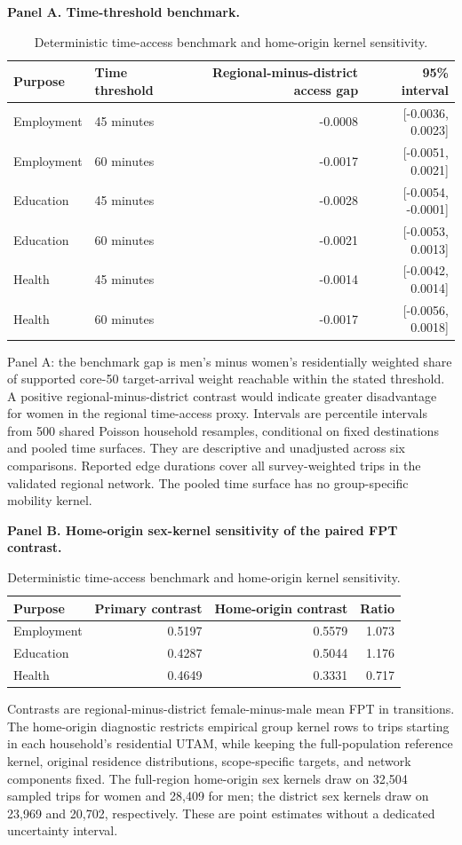 \begin{table}[ht]
\centering
\caption{Deterministic time-access benchmark and home-origin kernel sensitivity.}
\label{tab:s12_time_home}
\noindent\textbf{Panel A. Time-threshold benchmark.}\\[3pt]
\begin{tabular}{llrr}
\toprule
Purpose & Time threshold & Regional-minus-district access gap & 95\% interval \\
\midrule
Employment & 45 minutes & -0.0008 & [-0.0036, 0.0023] \\
Employment & 60 minutes & -0.0017 & [-0.0051, 0.0021] \\
Education & 45 minutes & -0.0028 & [-0.0054, -0.0001] \\
Education & 60 minutes & -0.0021 & [-0.0053, 0.0013] \\
Health & 45 minutes & -0.0014 & [-0.0042, 0.0014] \\
Health & 60 minutes & -0.0017 & [-0.0056, 0.0018] \\
\bottomrule
\end{tabular}

\smallskip
\footnotesize Panel A: the benchmark gap is men's minus women's residentially weighted share of supported core-50 target-arrival weight reachable within the stated threshold. A positive regional-minus-district contrast would indicate greater disadvantage for women in the regional time-access proxy. Intervals are percentile intervals from 500 shared Poisson household resamples, conditional on fixed destinations and pooled time surfaces. They are descriptive and unadjusted across six comparisons. Reported edge durations cover all survey-weighted trips in the validated regional network. The pooled time surface has no group-specific mobility kernel.
\par\medskip
\noindent\textbf{Panel B. Home-origin sex-kernel sensitivity of the paired FPT contrast.}\par\smallskip

\begin{tabular}{lrrr}
\toprule
Purpose & Primary contrast & Home-origin contrast & Ratio \\
\midrule
Employment & 0.5197 & 0.5579 & 1.073 \\
Education & 0.4287 & 0.5044 & 1.176 \\
Health & 0.4649 & 0.3331 & 0.717 \\
\bottomrule
\end{tabular}

\smallskip
\footnotesize Contrasts are regional-minus-district female-minus-male mean FPT in transitions. The home-origin diagnostic restricts empirical group kernel rows to trips starting in each household's residential UTAM, while keeping the full-population reference kernel, original residence distributions, scope-specific targets, and network components fixed. The full-region home-origin sex kernels draw on 32,504 sampled trips for women and 28,409 for men; the district sex kernels draw on 23,969 and 20,702, respectively. These are point estimates without a dedicated uncertainty interval.
\end{table}
